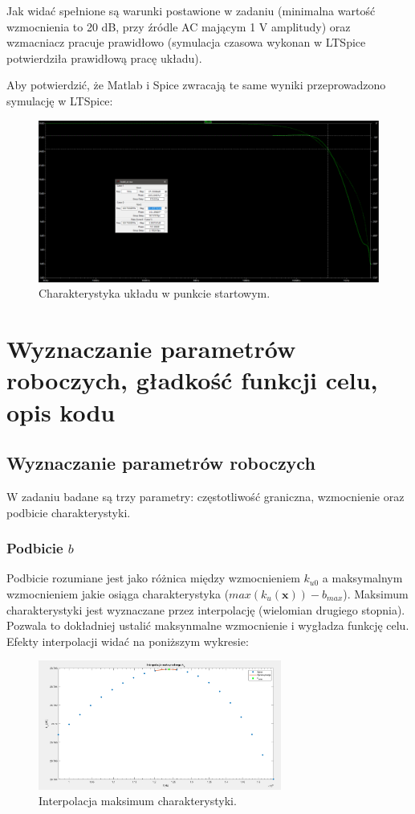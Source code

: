 \documentclass{article}
\begin{document}
Jak widać spełnione są warunki postawione w zadaniu (minimalna wartość wzmocnienia to 20 dB, przy źródle AC mającym 1 V amplitudy) oraz wzmacniacz pracuje prawidłowo (symulacja czasowa wykonan w LTSpice potwierdziła prawidłową pracę układu).
\pagebreak

Aby potwierdzić, że Matlab i Spice zwracają te same wyniki przeprowadzono symulację w LTSpice:
\begin{figure}[h]
	\includegraphics[width=12cm]{graphics/starting_point_spice.png}
	\centering
	\caption{Charakterystyka układu w punkcie startowym.}
\end{figure}




\section{Wyznaczanie parametrów roboczych, gładkość funkcji celu, opis kodu}
\subsection{Wyznaczanie parametrów roboczych}
W zadaniu badane są trzy parametry: częstotliwość graniczna, wzmocnienie oraz podbicie charakterystyki.

\subsubsection*{Podbicie $b$}
Podbicie rozumiane jest jako różnica między wzmocnieniem $k_{u0}$ a maksymalnym wzmocnieniem jakie osiąga charakterystyka ($max(k_{u}(\textbf{x}))-b_{max}$).
Maksimum charakterystyki jest wyznaczane przez interpolację (wielomian drugiego stopnia). Pozwala to dokładniej ustalić maksynmalne wzmocnienie i wygładza funkcję celu.
Efekty interpolacji widać na poniższym wykresie:
\begin{figure}[h]
	\includegraphics[width=8cm]{graphics/max_ku_interp.png}
	\centering
	\caption{Interpolacja maksimum charakterystyki.}
\end{figure}
\pagebreak
\end{document}
